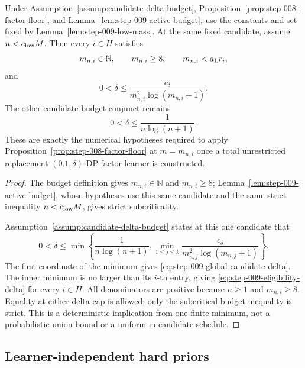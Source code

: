 \begin{proposition}
\label{prop:step-009-almm-eligibility}
Under Assumption~\ref{assump:candidate-delta-budget},
Proposition~\ref{prop:step-008-factor-floor}, and
Lemma~\ref{lem:step-009-active-budget}, use the constants and set fixed by
Lemma~\ref{lem:step-009-low-mass}.  At the same fixed candidate, assume
\(n<c_{\rm low}M\).  Then every \(i\in H\) satisfies
\begin{equation}\label{eq:step-009-eligibility-budget}
m_{n,i}\in\mathbb N,
\qquad m_{n,i}\ge8,
\qquad m_{n,i}<a_{\rm L}r_i,
\end{equation}
and
\begin{equation}\label{eq:step-009-eligibility-delta}
0<\delta\le
\frac{c_\delta}{m_{n,i}^2\log(m_{n,i}+1)}.
\end{equation}
The other candidate-budget conjunct remains
\begin{equation}\label{eq:step-009-global-candidate-delta}
0<\delta\le\frac1{n\log(n+1)}.
\end{equation}
These are exactly the numerical hypotheses required to apply
Proposition~\ref{prop:step-008-factor-floor} at \(m=m_{n,i}\) once a
total unrestricted replacement-\((0.1,\delta)\)-DP factor learner is
constructed.
\end{proposition}

\begin{proof}
The budget definition gives \(m_{n,i}\in\mathbb N\) and
\(m_{n,i}\ge8\); Lemma~\ref{lem:step-009-active-budget}, whose hypotheses
use this same candidate and the same strict inequality
\(n<c_{\rm low}M\), gives strict subcriticality.

Assumption~\ref{assump:candidate-delta-budget} states at this one candidate
that
\[
0<\delta\le
\min\left\{
\frac1{n\log(n+1)},
\min_{1\le j\le k}
\frac{c_\delta}{m_{n,j}^2\log(m_{n,j}+1)}
\right\}.
\]
The first coordinate of the minimum gives
\eqref{eq:step-009-global-candidate-delta}.  The inner minimum is no
larger than its \(i\)-th entry, giving
\eqref{eq:step-009-eligibility-delta} for every \(i\in H\).  All
denominators are positive because \(n\ge1\) and \(m_{n,i}\ge8\).
Equality at either delta cap is allowed; only the subcritical budget
inequality is strict.  This is a deterministic implication from one finite
minimum, not a probabilistic union bound or a uniform-in-candidate schedule.
\end{proof}

\subsection{Learner-independent hard priors}
\label{app:step-010}

